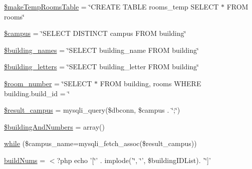 \begin{DoxyCompactItemize}
\item 
\hyperlink{manage_8php_ab664e3752ad88a1b92d5f9d505faa716}{\$make\-Temp\-Rooms\-Table} = \char`\"{}\-C\-R\-E\-A\-T\-E \-T\-A\-B\-L\-E rooms\-\_\-temp \-S\-E\-L\-E\-C\-T $\ast$ \-F\-R\-O\-M rooms\char`\"{}
\item 
\hyperlink{manage_8php_a6f0655994f3941d6ab50f681032f899b}{\$campus} = \char`\"{}\-S\-E\-L\-E\-C\-T \-D\-I\-S\-T\-I\-N\-C\-T campus \-F\-R\-O\-M building\char`\"{}
\item 
\hyperlink{manage_8php_a8ab55fcf525cc50064165d5b3e77e9a5}{\$building\-\_\-names} = \char`\"{}\-S\-E\-L\-E\-C\-T building\-\_\-name \-F\-R\-O\-M building\char`\"{}
\item 
\hyperlink{manage_8php_ab7c3ef21f41bcddbed5d1f3b591342da}{\$building\-\_\-letters} = \char`\"{}\-S\-E\-L\-E\-C\-T building\-\_\-letter \-F\-R\-O\-M building\char`\"{}
\item 
\hyperlink{manage_8php_a1f68a7fd1d38612fa4b61dda6e9bd035}{\$room\-\_\-number} = \char`\"{}\-S\-E\-L\-E\-C\-T $\ast$ \-F\-R\-O\-M building, rooms \-W\-H\-E\-R\-E building.\-build\-\_\-id = \char`\"{}
\item 
\hyperlink{manage_8php_afdd2ad9cb7726ebdf33d1095eac78a1a}{\$result\-\_\-campus} = mysqli\-\_\-query(\$dbconn, \$campus . \char`\"{};\char`\"{})
\item 
\hyperlink{manage_8php_ab991259438d75c98bca8f82bd9283a57}{\$building\-And\-Numbers} = array()
\item 
\hyperlink{manage_8php_aab1672b501262d8a7c242d2c87e1a361}{while} (\$campus\-\_\-name=mysqli\-\_\-fetch\-\_\-assoc(\$result\-\_\-campus))
\item 
\hyperlink{manage_8php_aaa4523e3eb6e4848efff15be60f7f802}{build\-Nums} = $<$?php echo '\mbox{[}\char`\"{}' . implode('\char`\"{}, \char`\"{}', \$building\-I\-D\-List). '\char`\"{}\mbox{]}'
\end{DoxyCompactItemize}


